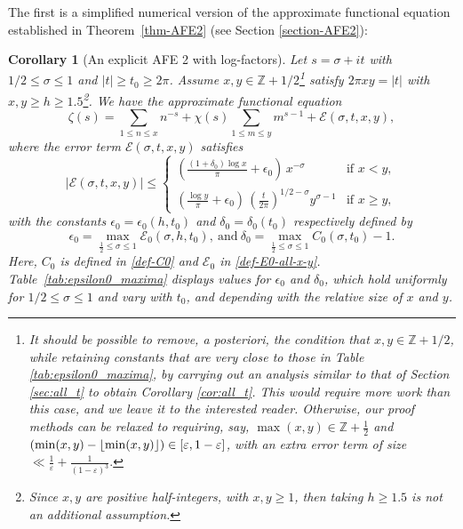 \documentclass[11pt,letterpaper,oneside,reqno]{amsart}
\DeclarePairedDelimiter\floor{\lfloor}{\rfloor}
\renewcommand{\^}[1]{\widehat{#1}}
\newcommand{\Z}{{\mathbb{Z}}}
\newcommand{\s}{\sigma}
\numberwithin{equation}{section}
\newtheorem{corollary}{Corollary}[theorem]
\theoremstyle{remark}
\newcommand*{\thmref}[1]{Theorem~\ref{#1}}
\begin{document}
The first is a simplified numerical version of the approximate functional equation established in \thmref{thm-AFE2} (see Section \ref{section-AFE2}):
%
\begin{corollary}[An explicit AFE 2 with log-factors] \label{cor-AFE2}
Let $s = \sigma + it$ with $1/2 \le \sigma \le 1$ and $|t| \ge t_0 \ge 2\pi$. Assume $x, y \in \mathbb{Z} + 1/2$\footnote{
It should be possible to remove, a posteriori, the condition that $x,y\in\Z+1/2$, while retaining constants that are very close to those in Table \ref{tab:epsilon0_maxima}, by carrying out an analysis similar to that of Section \ref{sec:all_t} to obtain Corollary \ref{cor:all_t}. This would require more work than this case, and we leave it to the interested reader. Otherwise, our proof methods can be relaxed to requiring, say, $\max(x,y)\in\Z+\frac{1}{2}$ and $(\min(x,y)-\floor{\min(x,y)})\in[\varepsilon,1-\varepsilon]$, with an extra error term of size $\ll\frac{1}{\varepsilon}+\frac{1}{(1-\varepsilon)^3}.$ } satisfy $2\pi xy = |t|$ with $x, y \ge h \ge 1.5$\footnote{Since $x, y$ are positive half-integers, with $x, y \ge 1$, then taking $h \ge 1.5$ is not an additional assumption.}. We have the approximate functional equation
\begin{equation}\label{corAFE2-explicit}
\zeta(s) = \sum_{1 \le n \le x} n^{-s} + \chi(s)\sum_{1 \le m \le y} m^{s-1} + \mathcal{E}(\sigma, t, x, y),
\end{equation}
where the error term $\mathcal{E}(\sigma, t, x, y)$ satisfies
\begin{equation}
|\mathcal{E}(\sigma, t, x, y)| \le 
\begin{cases}
\left(
\frac{(1+\delta_0)\log x}{\pi} + \epsilon_0
\right)
 \, x^{-\sigma} & \text{if } x < y, \\
 \left(
\frac{ \log y}{\pi} + \epsilon_0
\right)
\, \left(\frac{t}{2\pi}\right)^{1/2 - \sigma} y^{\sigma - 1}& \text{if } x \ge y,
\end{cases}
\end{equation}
with the constants $\epsilon_0=\epsilon_0(h, t_0)$ and $\delta_0=\delta_0(t_0)$ respectively defined by 
\begin{equation}\label{def:epsilon0-delta0}
\epsilon_0 = 
\max_{\frac{1}{2}\le \s \le 1}
\mathcal{E}_0(\sigma, h, t_0),\ \text{and}\ \delta_0= \max_{\frac{1}{2}\le \s \le 1} C_0(\sigma, t_0) -1.
\end{equation}
Here, $C_0$ is defined in \eqref{def-C0} and $\mathcal{E}_0$  in \eqref{def-E0-all-x-y}. 
Table~\ref{tab:epsilon0_maxima} displays values for $\epsilon_0$ and $\delta_0$, which hold uniformly for $1/2 \le \sigma \le 1$ and vary with $t_0$, and depending with the relative size of $x$ and $y$.

\end{corollary}
\end{document}
